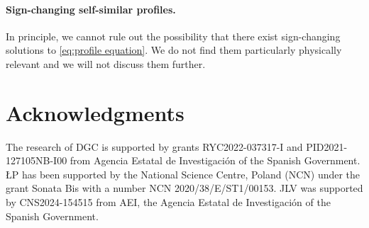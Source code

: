 \documentclass[a4paper]{article}
\theoremstyle{definition}
\begin{document}
\paragraph{Sign-changing self-similar profiles.} In principle, we cannot rule out the possibility that there exist sign-changing solutions to \eqref{eq:profile equation}. We do not find them particularly physically relevant and we will not discuss them further.

\section*{Acknowledgments}

The research of DGC is supported by grants RYC2022-037317-I and  PID2021-127105NB-I00 from Agencia Estatal de Investigación of the Spanish Government. \L{}P has been supported by the National Science Centre, Poland (NCN) under the grant Sonata Bis with a number NCN 2020/38/E/ST1/00153.
JLV was supported by CNS2024-154515 from AEI, the Agencia Estatal de Investigación of the Spanish Government.

\printbibliography

\appendix

%
%
%
%
%
%
%
%
%
%
%
%
%
%
%
%
%
%
%
%
%
%
%
%
%
%
%
%
%
%
%
%
%
%
%
%
%
%
%
%
%
%
%

%
%

%

%

%
%
%
%
%
%
%
%
%
%
%
%
%
%
%
%
%
%
%
%
%

%
%
%
%
%
%
%
%
%
%
%
%
%
%
%
%
%
%
%
%
%
%
%
%
%
%
%
%
%
%
%
%
%
%
%
%
%
%
%
%
%
%
%
%
%
%
%
%
%
%
%
%
%
%
%
%
%
%

%
%
%
%
%
%
%
%
%
%
%
%
%
%
%
%
%
%
%
%
%
%
%
%
%
%
%
%
%
%
%
%
%
%
%
%
%
%

%
%
%
%
%
%
%
%
%
%
%
%
%
%
%
%
%
%
%
%
%
%
%
%
%
%
%
%
%
%
%
%
%
%
%
%
%
%
%

%
%
%
%
%
%
%
%
%
%
%
%
%
%
%
%
%
%
%
%
%
%
%
%
%
%
%
%
%
%
%
%
%

%
%
%
%
%
%
%
%
%
%
%
%
%
%
%
%
%
%
%
%
%
%
%
%
%
%
%
%
%
%
%

%

%
%
%
%
%
%
%

%
%
%
%
%
%
%
%
%
%
%
%
%
%
%
%
%
%
%
%

%
%

%

%

%
%

%
%
%

%
%
%
%
%
%
%
%
%
%
%
%
%
%
%
%
%
%
%
%
%
%
%
%
%
%
%
%
%
%
%
%
%
%
%
\end{document}
